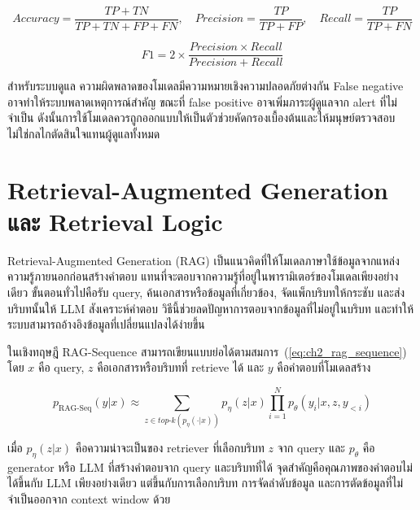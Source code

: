 \begin{equation}
    Accuracy = \frac{TP+TN}{TP+TN+FP+FN}, \quad
    Precision = \frac{TP}{TP+FP}, \quad
    Recall = \frac{TP}{TP+FN}
    \label{eq:ch2_classification_metrics}
\end{equation}

\begin{equation}
    F1 = 2 \times \frac{Precision \times Recall}{Precision + Recall}
    \label{eq:ch2_f1}
\end{equation}

สำหรับระบบดูแล ความผิดพลาดของโมเดลมีความหมายเชิงความปลอดภัยต่างกัน False negative อาจทำให้ระบบพลาดเหตุการณ์สำคัญ ขณะที่ false positive อาจเพิ่มภาระผู้ดูแลจาก alert ที่ไม่จำเป็น ดังนั้นการใช้โมเดลควรถูกออกแบบให้เป็นตัวช่วยคัดกรองเบื้องต้นและให้มนุษย์ตรวจสอบ ไม่ใช่กลไกตัดสินใจแทนผู้ดูแลทั้งหมด

\section{Retrieval-Augmented Generation และ Retrieval Logic}
\label{sec:ch2_rag_retrieval_logic}

Retrieval-Augmented Generation (RAG) เป็นแนวคิดที่ให้โมเดลภาษาใช้ข้อมูลจากแหล่งความรู้ภายนอกก่อนสร้างคำตอบ แทนที่จะตอบจากความรู้ที่อยู่ในพารามิเตอร์ของโมเดลเพียงอย่างเดียว ขั้นตอนทั่วไปคือรับ query, ค้นเอกสารหรือข้อมูลที่เกี่ยวข้อง, จัดแพ็กบริบทให้กระชับ และส่งบริบทนั้นให้ LLM สังเคราะห์คำตอบ วิธีนี้ช่วยลดปัญหาการตอบจากข้อมูลที่ไม่อยู่ในบริบท และทำให้ระบบสามารถอ้างอิงข้อมูลที่เปลี่ยนแปลงได้ง่ายขึ้น \cite{Lewis2020RAG}

ในเชิงทฤษฎี RAG-Sequence สามารถเขียนแบบย่อได้ตามสมการ~(\ref{eq:ch2_rag_sequence}) โดย $x$ คือ query, $z$ คือเอกสารหรือบริบทที่ retrieve ได้ และ $y$ คือคำตอบที่โมเดลสร้าง

\begin{equation}
    p_{\mathrm{RAG\text{-}Seq}}(y|x)
    \approx
    \sum_{z \in top\text{-}k(p_{\eta}(\cdot|x))}
    p_{\eta}(z|x)
    \prod_{i=1}^{N} p_{\theta}(y_i|x,z,y_{<i})
    \label{eq:ch2_rag_sequence}
\end{equation}

เมื่อ $p_{\eta}(z|x)$ คือความน่าจะเป็นของ retriever ที่เลือกบริบท $z$ จาก query และ $p_{\theta}$ คือ generator หรือ LLM ที่สร้างคำตอบจาก query และบริบทที่ได้ จุดสำคัญคือคุณภาพของคำตอบไม่ได้ขึ้นกับ LLM เพียงอย่างเดียว แต่ขึ้นกับการเลือกบริบท การจัดลำดับข้อมูล และการตัดข้อมูลที่ไม่จำเป็นออกจาก context window ด้วย

